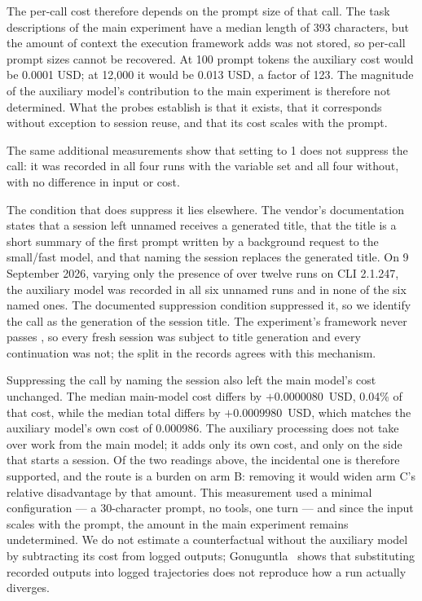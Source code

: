 \documentclass[a4paper,11pt]{article}
\newcommand{\spec}[1]{\texttt{\detokenize{#1}}}
\begin{document}
The per-call cost therefore depends on the prompt size of that call. The task descriptions of the main experiment have a median length of 393 characters, but the amount of context the execution framework adds was not stored, so per-call prompt sizes cannot be recovered. At 100 prompt tokens the auxiliary cost would be 0.0001 USD; at 12{,}000 it would be 0.013 USD, a factor of 123. The magnitude of the auxiliary model's contribution to the main experiment is therefore not determined. What the probes establish is that it exists, that it corresponds without exception to session reuse, and that its cost scales with the prompt.

The same additional measurements show that setting \spec{DISABLE_NON_ESSENTIAL_MODEL_CALLS} to 1 does not suppress the call: it was recorded in all four runs with the variable set and all four without, with no difference in input or cost.

The condition that does suppress it lies elsewhere. The vendor's documentation~\cite{ccsessions} states that a session left unnamed receives a generated title, that the title is a short summary of the first prompt written by a background request to the small/fast model, and that naming the session replaces the generated title. On 9 September 2026, varying only the presence of \spec{--name} over twelve runs on CLI 2.1.247, the auxiliary model was recorded in all six unnamed runs and in none of the six named ones. The documented suppression condition suppressed it, so we identify the call as the generation of the session title. The experiment's framework never passes \spec{--name}, so every fresh session was subject to title generation and every \spec{--resume} continuation was not; the split in the records agrees with this mechanism.

Suppressing the call by naming the session also left the main model's cost unchanged. The median main-model cost differs by $+0.0000080$~USD, 0.04\% of that cost, while the median total differs by $+0.0009980$~USD, which matches the auxiliary model's own cost of 0.000986. The auxiliary processing does not take over work from the main model; it adds only its own cost, and only on the side that starts a session. Of the two readings above, the incidental one is therefore supported, and the route is a burden on arm B: removing it would widen arm C's relative disadvantage by that amount. This measurement used a minimal configuration --- a 30-character prompt, no tools, one turn --- and since the input scales with the prompt, the amount in the main experiment remains undetermined. We do not estimate a counterfactual without the auxiliary model by subtracting its cost from logged outputs; Gonuguntla~\cite{replaygap} shows that substituting recorded outputs into logged trajectories does not reproduce how a run actually diverges.
\end{document}
